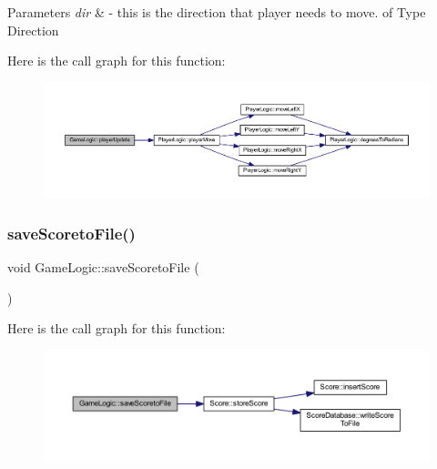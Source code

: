 \begin{DoxyParams}{Parameters}
{\em dir} & -\/ this is the direction that player needs to move. of Type Direction \\
\hline
\end{DoxyParams}
Here is the call graph for this function\+:\nopagebreak
\begin{figure}[H]
\begin{center}
\leavevmode
\includegraphics[width=350pt]{class_game_logic_a3bb909e55fc7c811aa0e3e6a92b881bb_cgraph}
\end{center}
\end{figure}
\mbox{\label{class_game_logic_a594da37684d54d619214e8f96b80279c}} 
\subsubsection{\texorpdfstring{save\+Scoreto\+File()}{saveScoretoFile()}}
{\footnotesize\ttfamily void Game\+Logic\+::save\+Scoreto\+File (\begin{DoxyParamCaption}{ }\end{DoxyParamCaption})}

Here is the call graph for this function\+:\nopagebreak
\begin{figure}[H]
\begin{center}
\leavevmode
\includegraphics[width=350pt]{class_game_logic_a594da37684d54d619214e8f96b80279c_cgraph}
\end{center}
\end{figure}
\mbox{\label{class_game_logic_a48f8e18378ed00053d83da991fcad264}} 
